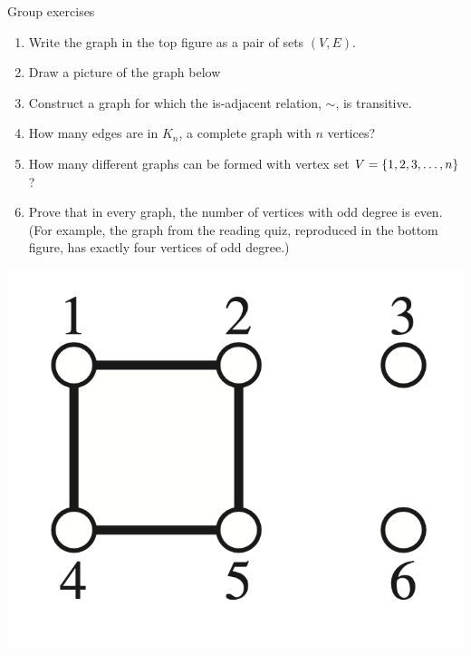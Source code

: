 \documentclass[10pt]{beamer}
\begin{document}
\begin{frame}{Group exercises}
\small 
\noindent
\begin{minipage}[c]{0.6\textwidth}
\begin{enumerate}
	\item  Write the graph in the top figure as a pair of sets $(V, E)$.
	\item Draw a picture of the graph below
    \item Construct a graph for which the is-adjacent relation, $\sim$, is transitive.
    \item How many edges are in $K_n$, a complete graph with $n$ vertices?
    \item How many different graphs can be formed with vertex set $V=\{ {1,2,3,\hdots,n} \}$?
    \item Prove that in every graph, the number of vertices with odd degree is even. (For example, the graph from the reading quiz, reproduced in the bottom figure, has exactly four vertices of odd degree.)
\end{enumerate}
\end{minipage}%
\hfill
\begin{minipage}[c]{0.38\textwidth}
    \includegraphics[width=\textwidth]{images/simple_graph_2} %
    \vfill 

\end{minipage}
\end{frame}
\end{document}
